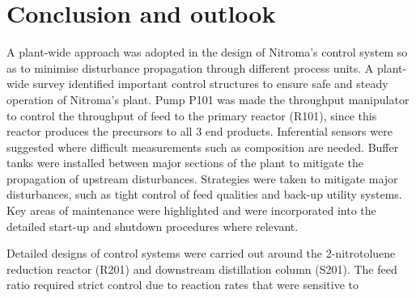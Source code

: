 \section{Conclusion and outlook}
A plant-wide approach was adopted in the design of Nitroma's control system so as to minimise disturbance propagation through different process units. A plant-wide survey identified important control structures to ensure safe and steady operation of Nitroma's plant. Pump P101 was made the throughput manipulator to control the throughput of feed to the primary reactor (R101), since this reactor produces the precursors to all 3 end products. Inferential sensors were suggested where difficult measurements such as composition are needed. Buffer tanks were installed between major sections of the plant to mitigate the propagation of upstream disturbances. Strategies were taken to mitigate major disturbances, such as tight control of feed qualities and back-up utility systems. Key areas of maintenance were highlighted and were incorporated into the detailed start-up and shutdown procedures where relevant.

Detailed designs of control systems were carried out around the 2-nitrotoluene reduction reactor (R201) and downstream distillation column (S201). The feed ratio required strict control due to reaction rates that were sensitive to 
